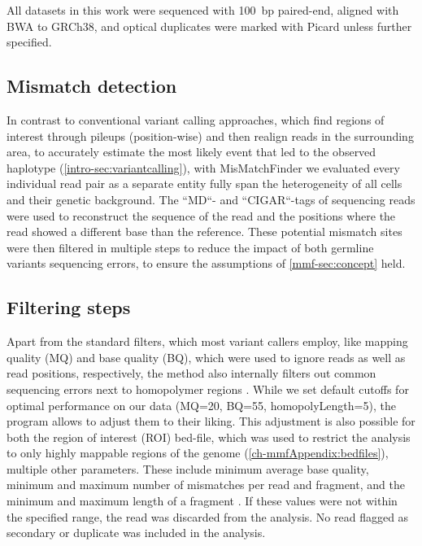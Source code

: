 All datasets in this work were sequenced with 100~bp paired-end, aligned with BWA to GRCh38, and optical duplicates were marked with Picard unless further specified.

\subsection{Mismatch detection}
In contrast to conventional variant calling approaches, which find regions of interest through pileups (position-wise) and then realign reads in the surrounding area, to accurately estimate the most likely event that led to the observed haplotype (\autoref{intro-sec:variantcalling}), with MisMatchFinder we evaluated every individual read pair as a separate entity fully span the heterogeneity of all cells and their genetic background. The ``MD``- and ``CIGAR``-tags of  sequencing reads were used to reconstruct the sequence of the read and the positions where the read showed a different base than the reference. These potential mismatch sites were then filtered in multiple steps to reduce the impact of both germline variants  sequencing errors, to ensure the assumptions of \autoref{mmf-sec:concept} held.

\subsection{Filtering steps}
Apart from the standard filters, which most variant callers employ, like mapping quality (MQ) and base quality (BQ), which were used to ignore reads as well as read positions, respectively, the method also internally filters out common sequencing errors next to homopolymer regions \cite{Heydari2019}. While we set default cutoffs for optimal performance on our data (MQ=20, BQ=55, homopolyLength=5), the program allows  to adjust them to their liking.
This adjustment is also possible for both the region of interest (ROI) bed-file, which was used to restrict the analysis to only highly mappable regions of the genome (\autoref{ch-mmfAppendix:bedfiles}),  multiple other parameters. These include  minimum average base quality, minimum and maximum number of mismatches per read and fragment, and the minimum and maximum length of a fragment \cite{Hudecova2021}. If these values were not within the specified range, the read was discarded from the analysis. No read flagged as secondary or duplicate was included in the analysis.

